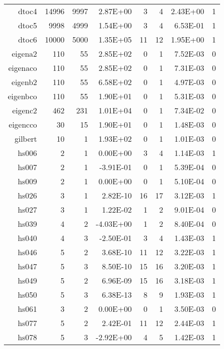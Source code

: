 \begin{table}[htbp]
\begin{tabular}{rrrrrrrr}
    dtoc4 & 14996 & 9997  & 2.87E+00 & 3     & 4     & 2.43E+00 & 1 \\
    dtoc5 & 9998  & 4999  & 1.54E+00 & 3     & 4     & 6.53E-01 & 1 \\
    dtoc6 & 10000 & 5000  & 1.35E+05 & 11    & 12    & 1.95E+00 & 1 \\
    eigena2 & 110   & 55    & 2.85E+02 & 0     & 1     & 7.52E-03 & 0 \\
    eigenaco & 110   & 55    & 2.85E+02 & 0     & 1     & 7.31E-03 & 0 \\
    eigenb2 & 110   & 55    & 6.58E+02 & 0     & 1     & 4.97E-03 & 0 \\
    eigenbco & 110   & 55    & 1.90E+01 & 0     & 1     & 5.31E-03 & 0 \\
    eigenc2 & 462   & 231   & 1.01E+04 & 0     & 1     & 7.34E-02 & 0 \\
    eigencco & 30    & 15    & 1.90E+01 & 0     & 1     & 1.48E-03 & 0 \\
    gilbert & 10    & 1     & 1.93E+02 & 0     & 1     & 1.01E-03 & 0 \\
    hs006 & 2     & 1     & 0.00E+00 & 3     & 4     & 1.14E-03 & 1 \\
    hs007 & 2     & 1     & -3.91E-01 & 0     & 1     & 5.39E-04 & 0 \\
    hs009 & 2     & 1     & 0.00E+00 & 0     & 1     & 5.10E-04 & 0 \\
    hs026 & 3     & 1     & 2.82E-10 & 16    & 17    & 3.12E-03 & 1 \\
    hs027 & 3     & 1     & 1.22E-02 & 1     & 2     & 9.01E-04 & 0 \\
    hs039 & 4     & 2     & -4.03E+00 & 1     & 2     & 8.40E-04 & 0 \\
    hs040 & 4     & 3     & -2.50E-01 & 3     & 4     & 1.43E-03 & 1 \\
    hs046 & 5     & 2     & 3.68E-10 & 11    & 12    & 3.22E-03 & 1 \\
    hs047 & 5     & 3     & 8.50E-10 & 15    & 16    & 3.20E-03 & 1 \\
    hs049 & 5     & 2     & 6.96E-09 & 15    & 16    & 3.18E-03 & 1 \\
    hs050 & 5     & 3     & 6.38E-13 & 8     & 9     & 1.93E-03 & 1 \\
    hs061 & 3     & 2     & 0.00E+00 & 0     & 1     & 3.50E-03 & 0 \\
    hs077 & 5     & 2     & 2.42E-01 & 11    & 12    & 2.44E-03 & 1 \\
    hs078 & 5     & 3     & -2.92E+00 & 4     & 5     & 1.42E-03 & 1 \\

\end{tabular}
\end{table}
